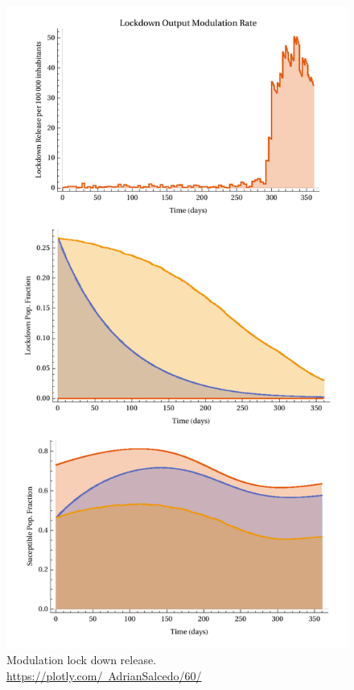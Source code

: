 \begin{figure}[tbh]
    \centering
    \includegraphics[scale=0.65, keepaspectratio]{figs/LockdownEffect}
    \caption{Modulation lock down release.
    \href{https://plotly.com/~AdrianSalcedo/60/}
    {https://plotly.com/~AdrianSalcedo/60/}}
    \label{fig:lockdowneffect}
\end{figure}

